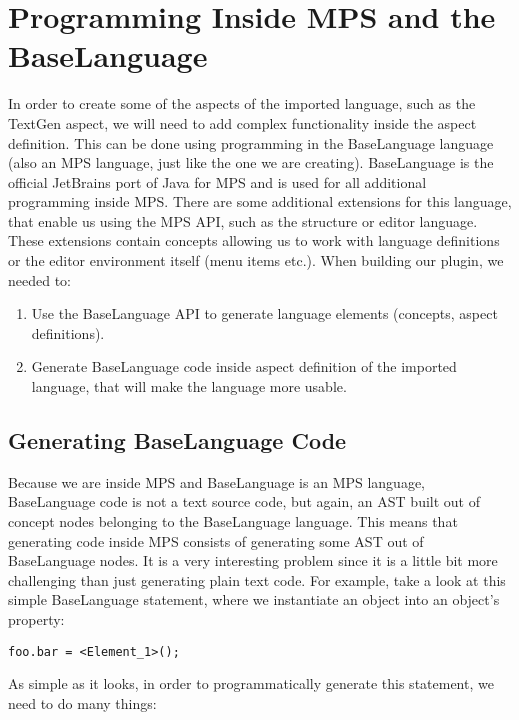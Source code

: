 \section{Programming Inside MPS and the BaseLanguage}
\label{chap:generating_code_inside_mps}

In order to create some of the aspects of the imported language, such as the TextGen aspect, we will need to add complex functionality inside the aspect definition.
This can be done using programming in the BaseLanguage language (also an MPS language, just like the one we are creating).
BaseLanguage is the official JetBrains port of Java for MPS and is used for all additional programming inside MPS.
There are some additional extensions for this language, that enable us using the MPS API, such as the structure or editor language.
These extensions contain concepts allowing us to work with language definitions or the editor environment itself (menu items etc.).
When building our plugin, we needed to:

\begin{enumerate}
	\item Use the BaseLanguage API to generate language elements (concepts, aspect definitions).

	\item Generate BaseLanguage code inside aspect definition of the imported language, that will make the language more usable.
\end{enumerate}

\subsection{Generating BaseLanguage Code}

Because we are inside MPS and BaseLanguage is an MPS language, BaseLanguage code is not a text source code, but again, an AST built out of concept nodes belonging to the BaseLanguage language.
This means that generating code inside MPS consists of generating some AST out of BaseLanguage nodes.
It is a very interesting problem since it is a little bit more challenging than just generating plain text code.
For example, take a look at this simple BaseLanguage statement, where we instantiate an object into an object's property:

\begin{center}
	\texttt{foo.bar = <Element{\_}1>();}
\end{center}

\noindent
As simple as it looks, in order to programmatically generate this statement, we need to do many things:

